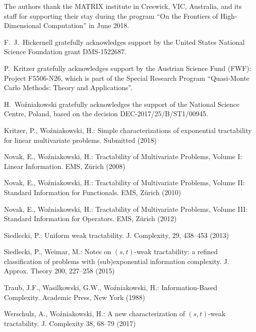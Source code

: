 \documentclass[graybox]{svmult}
\newcommand{\fh}[1]{{\color{green}{#1}}}
\begin{document}
\fh{Should we give a brief discussion about how (I think) we can get SPT and stronger notions of tractability in the ALG case, even though we cannot in the EXP case?}


%
\begin{acknowledgement}
The authors thank the MATRIX institute in Creswick, VIC, Australia, and its staff for supporting their 
stay during the program ``On the Frontiers of High-Dimensional Computation'' in June 2018. 

F.~J.~Hickernell gratefully acknowledges support by the United States National Science Foundation grant DMS-1522687.

P.~Kritzer gratefully acknowledges support by the Austrian Science Fund (FWF): Project F5506-N26, which is part
of the Special Research Program ``Quasi-Monte Carlo Methods: Theory and Applications''. 

H.~Wo\'{z}niakowski gratefully acknowledges the support of the National Science Centre, Poland, based on the decision 
DEC-2017/25/B/ST1/00945.
\end{acknowledgement}
%



\begin{thebibliography}{99.}%

 Kritzer, P., Wo\'{z}niakowski, H.: Simple characterizations of exponential tractability   
for linear multivariate problems. Submitted (2018)

Novak, E., Wo\'zniakowski, H.: Tractability    
of Multivariate Problems, Volume I: Linear Information. EMS, Z\"urich (2008)   
   
Novak, E., Wo\'zniakowski, H.: Tractability    
of Multivariate Problems, Volume II: Standard Information    
for Functionals. EMS, Z\"urich (2010)   
   
Novak, E., Wo\'zniakowski, H.: Tractability    
of Multivariate Problems, Volume III:    
Standard Information for Operators. EMS, Z\"urich (2012)   

Siedlecki, P.: Uniform weak tractability.   
J. Complexity, 29, 438--453 (2013)   

 Siedlecki, P., Weimar, M.: Notes on $(s,t)$-weak tractability: 
a refined classification of problems with (sub)exponential information complexity.
J. Approx. Theory 200, 227--258 (2015) 

Traub, J.F., Wasilkowski, G.W., Wo\'zniakowski, H.:   
Information-Based Complexity. Academic Press, New York (1988)   

 Werschulz, A., Wo\'{z}niakowski, H.: A new    
characterization of $(s,t)$-weak tractability. J. Complexity 38, 68--79 (2017) 

\end{thebibliography}
\end{document}

